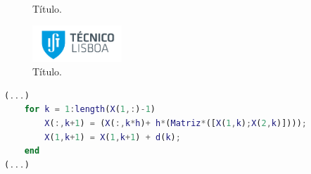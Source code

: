 \begin{figure}[H]
    \centering
    \qquad
    \\
    \qquad
    \caption{Título.}
    \label{fig:exemplo.3}
\end{figure}
\vspace*{-0.2cm}


\begin{figure}
    \centering
    \includegraphics[width=0.3\textwidth]{imagens/ist.png}
    \caption{Título.}
    \label{fig:exemplo.4}
\end{figure}


\begin{lstlisting}[frame=none,language=Matlab,label={code:exemplo},firstnumber=1,backgroundcolor=\color{gray!15}, basicstyle=\tiny\ttfamily]
(...)
    for k = 1:length(X(1,:)-1)
        X(:,k+1) = (X(:,k*h)+ h*(Matriz*([X(1,k);X(2,k)])));
        X(1,k+1) = X(1,k+1) + d(k);
    end
(...)
\end{lstlisting}


